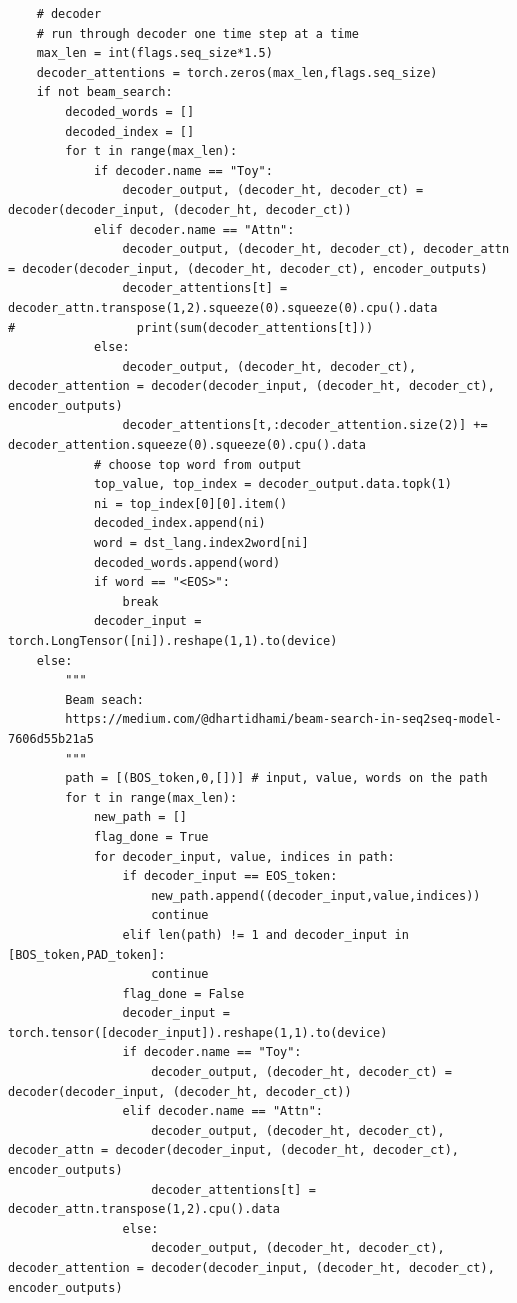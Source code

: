 \documentclass[logo,reportComp]{thesis}
\begin{document}
\begin{lstlisting}
    # decoder
    # run through decoder one time step at a time
    max_len = int(flags.seq_size*1.5)
    decoder_attentions = torch.zeros(max_len,flags.seq_size)
    if not beam_search:
        decoded_words = []
        decoded_index = []
        for t in range(max_len):
            if decoder.name == "Toy":
                decoder_output, (decoder_ht, decoder_ct) = decoder(decoder_input, (decoder_ht, decoder_ct))
            elif decoder.name == "Attn":
                decoder_output, (decoder_ht, decoder_ct), decoder_attn = decoder(decoder_input, (decoder_ht, decoder_ct), encoder_outputs)
                decoder_attentions[t] = decoder_attn.transpose(1,2).squeeze(0).squeeze(0).cpu().data
#                 print(sum(decoder_attentions[t]))
            else:
                decoder_output, (decoder_ht, decoder_ct), decoder_attention = decoder(decoder_input, (decoder_ht, decoder_ct), encoder_outputs)
                decoder_attentions[t,:decoder_attention.size(2)] += decoder_attention.squeeze(0).squeeze(0).cpu().data
            # choose top word from output
            top_value, top_index = decoder_output.data.topk(1)
            ni = top_index[0][0].item()
            decoded_index.append(ni)
            word = dst_lang.index2word[ni]
            decoded_words.append(word)
            if word == "<EOS>":
                break
            decoder_input = torch.LongTensor([ni]).reshape(1,1).to(device)
    else:
        """
        Beam seach:
        https://medium.com/@dhartidhami/beam-search-in-seq2seq-model-7606d55b21a5
        """
        path = [(BOS_token,0,[])] # input, value, words on the path
        for t in range(max_len):
            new_path = []
            flag_done = True
            for decoder_input, value, indices in path:
                if decoder_input == EOS_token:
                    new_path.append((decoder_input,value,indices))
                    continue
                elif len(path) != 1 and decoder_input in [BOS_token,PAD_token]:
                    continue
                flag_done = False
                decoder_input = torch.tensor([decoder_input]).reshape(1,1).to(device)
                if decoder.name == "Toy":
                    decoder_output, (decoder_ht, decoder_ct) = decoder(decoder_input, (decoder_ht, decoder_ct))
                elif decoder.name == "Attn":
                    decoder_output, (decoder_ht, decoder_ct), decoder_attn = decoder(decoder_input, (decoder_ht, decoder_ct), encoder_outputs)
                    decoder_attentions[t] = decoder_attn.transpose(1,2).cpu().data
                else:
                    decoder_output, (decoder_ht, decoder_ct), decoder_attention = decoder(decoder_input, (decoder_ht, decoder_ct), encoder_outputs)

\end{lstlisting}
\end{document}
